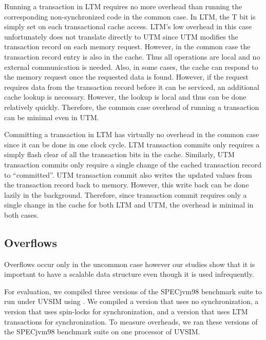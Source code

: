 Running a transaction in LTM requires no more overhead than running
the corresponding non-synchronized code in the common case. In LTM,
the T bit is simply set on each transactional cache access. LTM's low
overhead in this case unfortunately does not translate directly to UTM
since UTM modifies the transaction record on each memory
request. However, in the common case the transaction record entry is
also in the cache. Thus all operations are local and no external
communication is needed. Also, in some cases, the cache can respond to
the memory request once the requested data is found. However, if the
request requires data from the transaction record before it can be
serviced, an additional cache lookup is necessary. However, the lookup
is local and thus can be done relatively quickly.  Therefore, the common case overhead of
running a transaction can be minimal even in UTM.

Committing a transaction in LTM has virtually no overhead in the
common case since it can be done in one clock cycle. LTM transaction
commits only requires a simply flash clear of all the transaction bits
in the cache. Similarly, UTM transaction commits only require a single
change of the cached transaction record to ``committed''. UTM
transaction commit also writes the updated values from the transaction
record back to memory. However, this write back can be done lazily in
the background.  Therefore, since transaction commit requires only a
single change in the cache for both LTM and UTM, the overhead is
minimal in both cases.

\subsection{Overflows}

Overflows occur only in the uncommon case
however our studies show that it is important to have a scalable data
structure even though it is used infrequently.

For evaluation, we compiled three versions of the SPECjvm98 benchmark
suite to run under UVSIM using \flex. We compiled
a  version that uses no synchronization, a 
version that uses spin-locks for synchronization, and a 
version that uses LTM transactions for synchronization. To measure
overheads, we ran these versions of the SPECjvm98 benchmark suite on
one processor of UVSIM.

